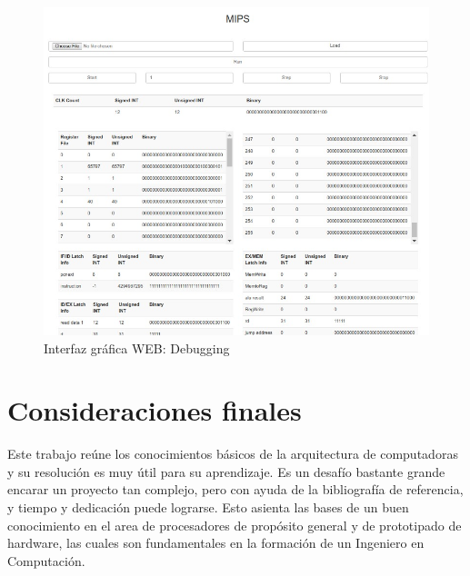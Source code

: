 \documentclass[12pt]{article}
\begin{document}
\begin{figure}[ht]
\centering
\hspace*{-1cm}
\includegraphics[width=1\textwidth]{imagenes/interfaz.jpeg}
\caption{Interfaz gráfica WEB: Debugging}
\label{fig:interfaz}
\end{figure}

\section{Consideraciones finales}

Este trabajo reúne los conocimientos básicos de la arquitectura de computadoras y su resolución es muy útil para su aprendizaje. Es un desafío bastante grande encarar un proyecto tan complejo, pero con ayuda de la bibliografía de referencia, y tiempo y dedicación puede lograrse. Esto asienta las bases de un buen conocimiento en el area de procesadores de propósito general y de prototipado de hardware, las cuales son fundamentales en la formación de un Ingeniero en Computación.



\end{document}

